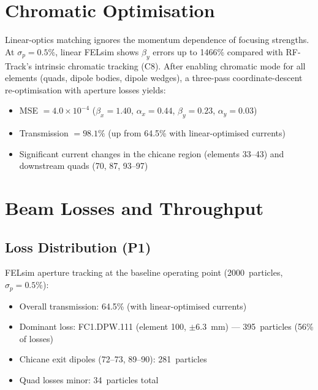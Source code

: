 \documentclass[11pt]{article}
\begin{document}
\section{Chromatic Optimisation}
\label{sec:chromatic}

Linear-optics matching ignores the momentum dependence of focusing
strengths.  At $\sigma_p = 0.5\%$, linear FELsim shows $\beta_y$ errors
up to 1466\% compared with RF-Track's intrinsic chromatic tracking (C8).
After enabling chromatic mode for all elements (quads, dipole bodies,
dipole wedges), a three-pass coordinate-descent re-optimisation with
aperture losses yields:
\begin{itemize}[nosep]
  \item MSE $= 4.0 \times 10^{-4}$
    ($\beta_x = 1.40$, $\alpha_x = 0.44$, $\beta_y = 0.23$,
    $\alpha_y = 0.03$)
  \item Transmission $= 98.1\%$ (up from 64.5\% with linear-optimised
    currents)
  \item Significant current changes in the chicane region (elements
    33--43) and downstream quads (70, 87, 93--97)
\end{itemize}


\section{Beam Losses and Throughput}
\label{sec:losses}

\subsection{Loss Distribution (P1)}

FELsim aperture tracking at the baseline operating point
(2000~particles, $\sigma_p = 0.5\%$):
\begin{itemize}[nosep]
  \item Overall transmission: 64.5\% (with linear-optimised currents)
  \item Dominant loss: FC1.DPW.111 (element 100, $\pm$\SI{6.3}{mm})
    --- 395~particles (56\% of losses)
  \item Chicane exit dipoles (72--73, 89--90): 281~particles
  \item Quad losses minor: 34~particles total
\end{itemize}
\end{document}
